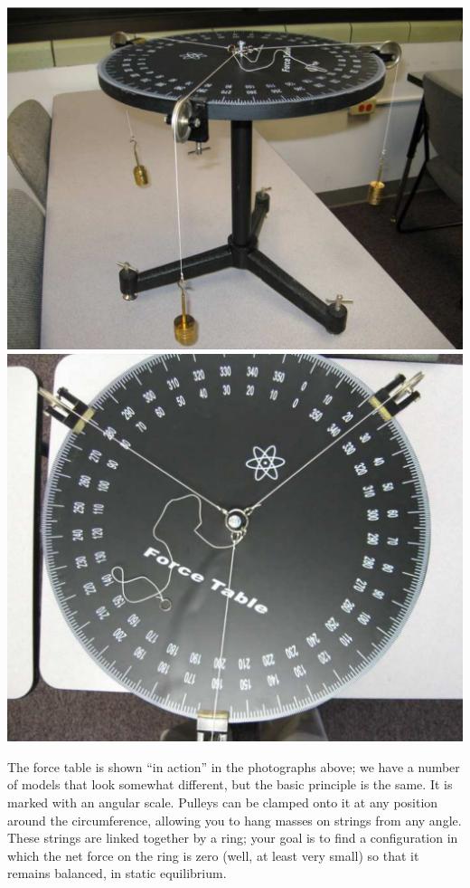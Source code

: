 \documentclass[11pt]{article}
\begin{document}
\begin{center}
\includegraphics[height=0.30\textheight]{force_table_side1.pdf}
\includegraphics[height=0.30\textheight]{force_table_top1.pdf}
\end{center}

The force table is shown ``in action'' in the photographs above; we have a 
number of models that look somewhat different, but the basic principle is 
the same.  It is marked with an angular scale.  Pulleys can be clamped onto
it at any position around the circumference, allowing you to hang masses
on strings from any angle.  These strings are linked together by a ring;
your goal is to find a configuration in which the net force on the ring 
is zero (well, at least very small) so that it remains balanced, 
in static equilibrium.
\newpage
\end{document}
